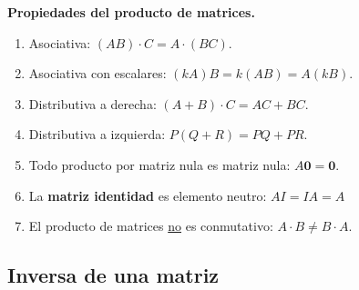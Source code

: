 \documentclass[12pt]{article}
\begin{document}
\textbf{Propiedades del producto de matrices.}

\begin{enumerate}
  \item Asociativa: \((AB) \cdot C = A \cdot (BC)\).
  \item Asociativa con escalares: \((kA)B = k(AB) = A(kB)\).
  \item Distributiva a derecha: \((A+B)\cdot C = AC + BC\). 
  \item Distributiva a izquierda: \(P(Q+R) = PQ + PR\).
  \item Todo producto por matriz nula es matriz nula: 
  \(A\mathbf{0} = \mathbf{0}\).
  \item La \textbf{matriz identidad} es elemento neutro:
  \(AI = IA = A\)
  \item El producto de matrices \underline{no} es conmutativo: 
  \(A \cdot B \neq B \cdot A\).
\end{enumerate}

\subsection{Inversa de una matriz}
\end{document}
